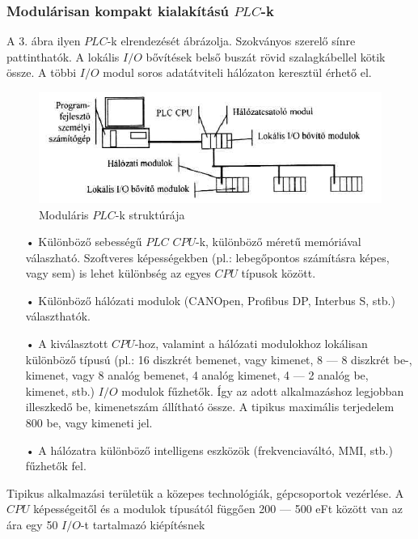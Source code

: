 \documentclass[11pt,a4paper]{article}
\begin{document}
\subsubsection{Modulárisan kompakt kialakítású $PLC$-k}
A 3. ábra ilyen $PLC$-k elrendezését ábrázolja. Szokványos szerelő sínre pattinthatók. A lokális $I/O$ bővítések belső buszát rövid szalagkábellel kötik  össze. A többi $I/O$ modul soros adatátviteli hálózaton keresztül érhető el.
\begin{figure}[hbtp]
    	 \centering
		\includegraphics[scale=0.7]{3_modularis_plc.png}
		\caption{Moduláris $PLC$-k struktúrája}
\end{figure}
\begin{enumerate}
	\item[•]Különböző sebességű $PLC$ $CPU$-k, különböző méretű memóriával válaszható. Szoftveres képességekben (pl.: lebegőpontos számításra képes, vagy sem) is lehet különbség az egyes $CPU$ típusok között.
	\item[•]Különböző hálózati modulok (CANOpen, Profibus DP, Interbus S, stb.) választhatók.
	\item[•]A kiválasztott $CPU$-hoz, valamint a hálózati modulokhoz lokálisan különböző típusú (pl.: 16 diszkrét bemenet, vagy kimenet, 8 — 8 diszkrét be-, kimenet, vagy 8 analóg bemenet, 4 analóg kimenet, 4 — 2 analóg be, kimenet, stb.) $I/O$ modulok fűzhetők. Így az adott alkalmazáshoz legjobban illeszkedő be, kimenetszám állítható össze. A tipikus maximális terjedelem 800 be, vagy kimeneti jel.
	\item[•]A hálózatra különböző intelligens eszközök (frekvenciaváltó, MMI, stb.) fűzhetők fel.
\end{enumerate}
Tipikus alkalmazási területük a közepes technológiák, gépcsoportok vezérlése. A $CPU$ képességeitől és a modulok típusától függően 200 — 500 eFt  között van az ára egy 50 $I/O$-t tartalmazó kiépítésnek
\end{document}
